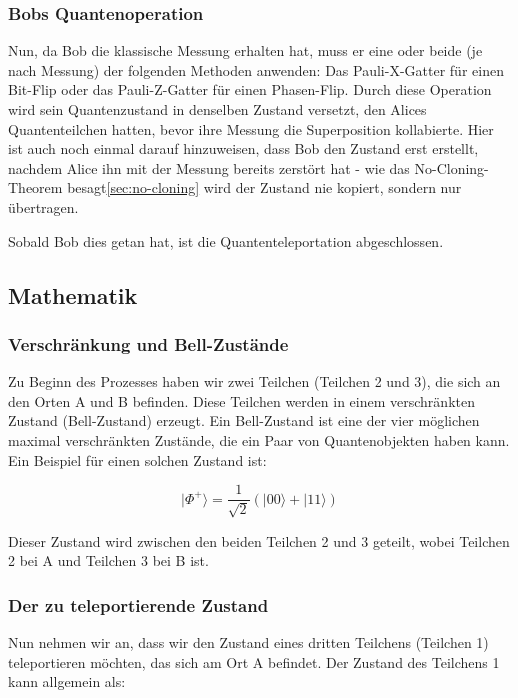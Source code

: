 \subsubsection{Bobs Quantenoperation}
Nun, da Bob die klassische Messung erhalten hat, muss er eine oder beide (je nach Messung) der folgenden Methoden anwenden: Das
Pauli-X-Gatter für einen Bit-Flip oder das Pauli-Z-Gatter für einen Phasen-Flip.
Durch diese Operation wird sein Quantenzustand in denselben Zustand versetzt, den Alices Quantenteilchen hatten, bevor ihre
Messung die Superposition kollabierte.
Hier ist auch noch einmal darauf hinzuweisen, dass Bob den Zustand erst erstellt, nachdem Alice ihn mit der Messung
bereits zerstört hat - wie das No-Cloning-Theorem besagt\ref{sec:no-cloning} wird der Zustand nie kopiert, sondern nur
übertragen.

Sobald Bob dies getan hat, ist die Quantenteleportation abgeschlossen.
\subsection{Mathematik}\label{subsec:proof2}

\subsubsection{Verschränkung und Bell-Zustände}

Zu Beginn des Prozesses haben wir zwei Teilchen (Teilchen 2 und 3), die sich an den Orten A und B befinden.
Diese Teilchen werden in einem verschränkten Zustand (Bell-Zustand) erzeugt.
Ein Bell-Zustand ist eine der vier möglichen maximal verschränkten Zustände, die ein Paar von Quantenobjekten haben kann.
Ein Beispiel für einen solchen Zustand ist:

\begin{equation}
|\Phi^+\rangle = \frac{1}{\sqrt{2}} \left( |00\rangle + |11\rangle \right)
\end{equation}

Dieser Zustand wird zwischen den beiden Teilchen 2 und 3 geteilt, wobei Teilchen 2 bei A und Teilchen 3 bei B ist.

\subsubsection{Der zu teleportierende Zustand}

Nun nehmen wir an, dass wir den Zustand eines dritten Teilchens (Teilchen 1) teleportieren möchten, das sich am Ort A befindet. Der Zustand des Teilchens 1 kann allgemein als:

